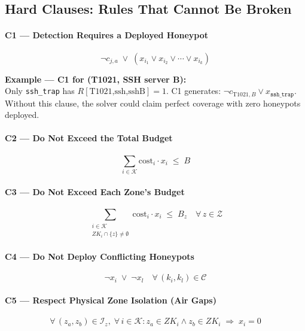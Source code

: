 \documentclass[journal]{IEEEtran}
\newcommand{\calK}{\mathcal{K}}
\newcommand{\calZ}{\mathcal{Z}}
\newcommand{\calC}{\mathcal{C}}
\begin{document}
\subsection{Hard Clauses: Rules That Cannot Be Broken}

\paragraph{C1 --- Detection Requires a Deployed Honeypot}
\begin{equation}
  \neg c_{j,a} \;\vee\;
  (x_{i_1} \vee x_{i_2} \vee \cdots \vee x_{i_k})
\end{equation}

\begin{examplebox}
\textbf{Example --- C1 for (T1021, SSH server B):}\\
Only \texttt{ssh\_trap} has $R[\text{T1021,ssh,sshB}]=1$.
C1 generates: $\neg c_{\text{T1021},B}
\vee x_{\texttt{ssh\_trap}}$.
Without this clause, the solver could claim perfect coverage
with zero honeypots deployed.
\end{examplebox}

\paragraph{C2 --- Do Not Exceed the Total Budget}
\begin{equation}
  \sum_{i \in \calK} \mathrm{cost}_i \cdot x_i \;\leq\; B
\end{equation}

\paragraph{C3 --- Do Not Exceed Each Zone's Budget}
\begin{equation}
  \sum_{\substack{i \in \calK \\ ZK_i \cap \{z\} \neq \emptyset}}
  \mathrm{cost}_i \cdot x_i \;\leq\; B_z
  \quad \forall\, z \in \calZ
\end{equation}

\paragraph{C4 --- Do Not Deploy Conflicting Honeypots}
\begin{equation}
  \neg x_i \;\vee\; \neg x_l
  \quad \forall\,(k_i,k_l) \in \calC
\end{equation}

\paragraph{C5 --- Respect Physical Zone Isolation (Air Gaps)}
\begin{equation}
  \forall\,(z_a,z_b) \in \mathcal{I}_z,\;
  \forall\, i \in \calK :
  z_a \in ZK_i \wedge z_b \in ZK_i
  \;\Longrightarrow\; x_i = 0
\end{equation}
\end{document}
